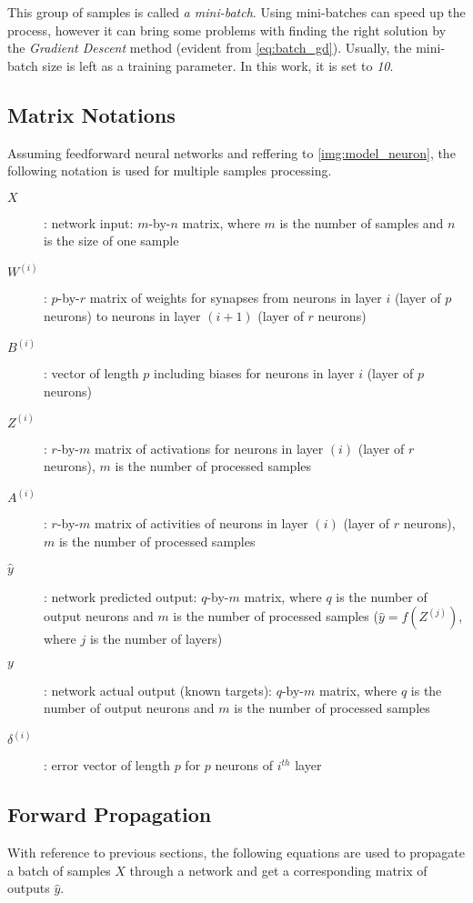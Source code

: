 This group of samples is called \textit{a mini-batch}. Using mini-batches can speed up the process, however it can bring some problems with finding the right solution by the \textit{Gradient Descent} method (evident from \cref{eq:batch_gd}). Usually, the mini-batch size is left as a training parameter. In this work, it is set to \textit{10}.

\subsection{Matrix Notations} \label{ssec:matrix_notation}
Assuming feedforward neural networks and reffering to \cref{img:model_neuron}, the following notation is used for multiple samples processing.

\begin{description}
\item[$ X $] : network input: $ m $-by-$ n $ matrix, where $ m $ is the number of samples and $ n $ is the size of one sample
\item[$ W^{(i)} $] : $ p $-by-$ r $ matrix of weights for synapses from neurons in layer $ i $ (layer of $ p $ neurons) to neurons in layer $ (i+1) $ (layer of $ r $ neurons)
\item[$ B^{(i)} $] : vector of length $ p $ including biases for neurons in layer $ i $ (layer of $ p $ neurons)
\item[$ Z^{(i)} $] : $ r $-by-$ m $ matrix of activations for neurons in layer $ (i) $ (layer of $ r $ neurons), $ m $ is the number of processed samples
\item[$ A^{(i)} $] : $ r $-by-$ m $ matrix of activities of neurons in layer $ (i) $ (layer of $ r $ neurons), $ m $ is the number of processed samples
\item[$ \hat{y} $] : network predicted output: $ q $-by-$ m $ matrix, where $ q $ is the number of output neurons and $ m $ is the number of processed samples ($ \hat{y} = f(Z^{(j)}) $, where $ j $ is the number of layers)
\item[$ y $] : network actual output (known targets): $ q $-by-$ m $ matrix, where $ q $ is the number of output neurons and $ m $ is the number of processed samples
\item[$ \delta^{(i)} $] : error vector of length $ p $ for $ p $ neurons of $ i^{th} $ layer
\end{description}

\subsection{Forward Propagation} \label{ssec:forward_propagation}
With reference to previous sections, the following equations are used to propagate a batch of samples $ X $ through a network and get a corresponding matrix of outputs $ \hat{y} $.

